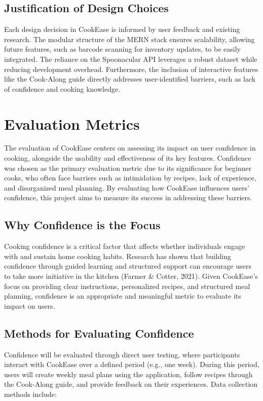 \documentclass[10pt,twocolumn]{article}
\begin{document}
\subsection{Justification of Design Choices}
Each design decision in CookEase is informed by user feedback and existing research. The modular structure of the MERN stack ensures scalability, allowing future features, such as barcode scanning for inventory updates, to be easily integrated. The reliance on the Spoonacular API leverages a robust dataset while reducing development overhead. Furthermore, the inclusion of interactive features like the Cook-Along guide directly addresses user-identified barriers, such as lack of confidence and cooking knowledge.

\section{Evaluation Metrics}
The evaluation of CookEase centers on assessing its impact on user confidence in cooking, alongside the usability and effectiveness of its key features. Confidence was chosen as the primary evaluation metric due to its significance for beginner cooks, who often face barriers such as intimidation by recipes, lack of experience, and disorganized meal planning. By evaluating how CookEase influences users’ confidence, this project aims to measure its success in addressing these barriers.

\subsection{Why Confidence is the Focus}
Cooking confidence is a critical factor that affects whether individuals engage with and sustain home cooking habits. Research has shown that building confidence through guided learning and structured support can encourage users to take more initiative in the kitchen (Farmer & Cotter, 2021). Given CookEase's focus on providing clear instructions, personalized recipes, and structured meal planning, confidence is an appropriate and meaningful metric to evaluate its impact on users.

\subsection{Methods for Evaluating Confidence}
Confidence will be evaluated through direct user testing, where participants interact with CookEase over a defined period (e.g., one week). During this period, users will create weekly meal plans using the application, follow recipes through the Cook-Along guide, and provide feedback on their experiences. Data collection methods include:
\end{document}
